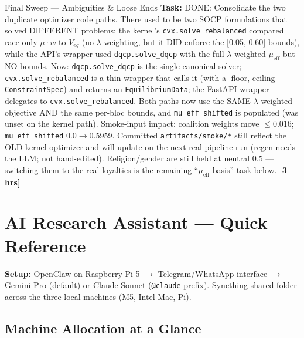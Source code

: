 \documentclass[11pt]{article}
\newcommand{\hrs}[1]{\textbf{[#1 hrs]}}
\newcommand{\task}[2]{%
  \noindent\textbf{Task:} #1 \hfill \hrs{#2}\\}
\begin{document}
\begin{taskbox}{Final Sweep --- Ambiguities \& Loose Ends}
\task{DONE: Consolidate the two duplicate optimizer code paths. There used to be
  two SOCP formulations that solved DIFFERENT problems: the kernel's
  \texttt{cvx.solve\_rebalanced} compared race-only $\mu\cdot w$ to $V_{eq}$ (no
  $\lambda$ weighting, but it DID enforce the [0.05, 0.60] bounds), while the
  API's wrapper used \texttt{dqcp.solve\_dqcp} with the full $\lambda$-weighted
  $\mu_{\text{eff}}$ but NO bounds. Now: \texttt{dqcp.solve\_dqcp} is the single
  canonical solver; \texttt{cvx.solve\_rebalanced} is a thin wrapper that calls it
  (with a [floor, ceiling] \texttt{ConstraintSpec}) and returns an
  \texttt{EquilibriumData}; the FastAPI wrapper delegates to
  \texttt{cvx.solve\_rebalanced}. Both paths now use the SAME $\lambda$-weighted
  objective AND the same per-bloc bounds, and \texttt{mu\_eff\_shifted} is
  populated (was unset on the kernel path). Smoke-input impact: coalition weights
  move $\le 0.016$; \texttt{mu\_eff\_shifted} 0.0$\to$0.5959. Committed
  \texttt{artifacts/smoke/*} still reflect the OLD kernel optimizer and will
  update on the next real pipeline run (regen needs the LLM; not hand-edited).
  Religion/gender are still held at neutral 0.5 --- switching them to the real
  loyalties is the remaining ``$\mu_{\text{eff}}$ basis'' task below.}{3}

\end{taskbox}

\newpage
\section*{AI Research Assistant --- Quick Reference}

\textbf{Setup:} OpenClaw on Raspberry Pi 5 $\to$ Telegram/WhatsApp interface $\to$
Gemini Pro (default) or Claude Sonnet (\texttt{@claude} prefix).
Syncthing shared folder across the three local machines (M5, Intel Mac, Pi).

\subsection*{Machine Allocation at a Glance}
\end{document}

